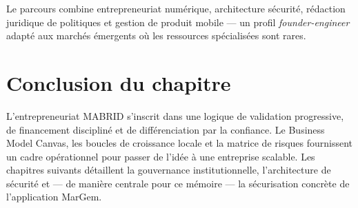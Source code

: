 Le parcours combine entrepreneuriat numérique, architecture sécurité, rédaction juridique de politiques et gestion de produit mobile --- un profil \emph{founder-engineer} adapté aux marchés émergents où les ressources spécialisées sont rares.

\section{Conclusion du chapitre}

L'entrepreneuriat MABRID s'inscrit dans une logique de validation progressive, de financement discipliné et de différenciation par la confiance. Le Business Model Canvas, les boucles de croissance locale et la matrice de risques fournissent un cadre opérationnel pour passer de l'idée à une entreprise scalable. Les chapitres suivants détaillent la gouvernance institutionnelle, l'architecture de sécurité et --- de manière centrale pour ce mémoire --- la sécurisation concrète de l'application MarGem.
